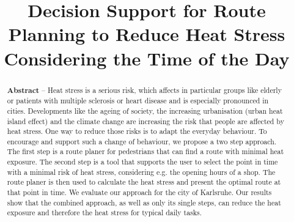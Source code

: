 \documentclass[a4paper,parskip=half]{scrartcl}
\title{Decision Support for Route Planning to Reduce Heat Stress Considering the Time of the Day}
\author{}
\begin{document}
\maketitle

\begin{abstract}
\noindent \textbf{Abstract} -- Heat stress is a serious risk, which affects in particular  groups like elderly or patients with multiple sclerosis or heart disease and is especially pronounced in cities. Developments like the ageing of society, the increasing urbanisation (urban heat island effect) and the climate change are increasing the risk that people are affected by heat stress. One way to reduce those risks is to adapt the everyday behaviour. 
To encourage and support such a change of behaviour, we propose a two step approach. The first step is a route planer for pedestrians that can find a route with minimal heat exposure. The second step is a tool that supports the user to select the point in time with a minimal risk of heat stress, considering e.g. the opening hours of a shop. The route planer is then used to calculate the heat stress and present the optimal route at that point in time.
We evaluate our approach for the city of Karlsruhe. 	
Our results show that the combined approach, as well as only its single steps, can reduce the heat exposure and therefore the heat stress for typical daily tasks.
\end{abstract}





%


\printbibliography
\end{document}
